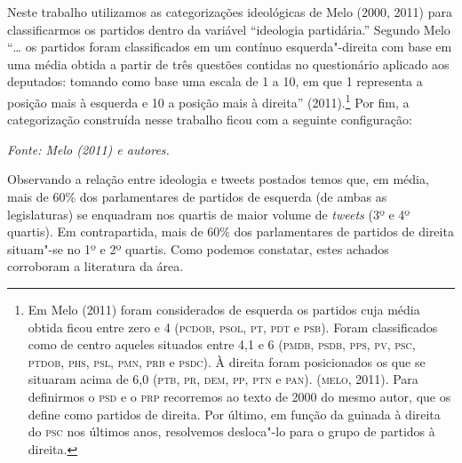 Neste trabalho utilizamos as categorizações ideológicas de Melo (2000,
2011) para classificarmos os partidos dentro da variável ``ideologia
partidária.'' Segundo Melo ``\ldots{} os partidos foram classificados em um
contínuo esquerda"-direita com base em uma média obtida a partir de três
questões contidas no questionário aplicado aos deputados: tomando como
base uma escala de 1 a 10, em que 1 representa a posição mais à esquerda
e 10 a posição mais à direita'' (2011).\footnote{Em Melo (2011) foram
  considerados de esquerda os partidos cuja média obtida ficou entre
  zero e 4 (\textsc{pcdob}, \textsc{psol}, \textsc{pt}, \textsc{pdt} e \textsc{psb}). Foram classificados como de
  centro aqueles situados entre 4,1 e 6 (\textsc{pmdb}, \textsc{psdb}, \textsc{pps}, \textsc{pv}, \textsc{psc},
  \textsc{ptdob}, \textsc{phs}, \textsc{psl}, \textsc{pmn}, \textsc{prb} e \textsc{psdc}). À direita foram posicionados os que
  se situaram acima de 6,0 (\textsc{ptb}, \textsc{pr}, \textsc{dem}, \textsc{pp}, \textsc{ptn} e \textsc{pan}). (\textsc{melo}, 2011).
  Para definirmos o \textsc{psd} e o \textsc{prp} recorremos ao texto de 2000 do mesmo
  autor, que os define como partidos de direita. Por último, em função
  da guinada à direita do \textsc{psc} nos últimos anos, resolvemos desloca"-lo
  para o grupo de partidos à direita.} Por fim, a categorização
construída nesse trabalho ficou com a seguinte configuração:

\begin{center}

{\footnotesize\emph{Fonte: Melo (2011) e autores.}}
\end{center}

Observando a relação entre ideologia e tweets postados temos que, em
média, mais de 60\% dos parlamentares de partidos de esquerda (de ambas
as legislaturas) se enquadram nos quartis de maior volume de
\emph{tweets} (3º e 4º quartis). Em contrapartida, mais de 60\% dos
parlamentares de partidos de direita situam"-se no 1º e 2º quartis. Como
podemos constatar, estes achados corroboram a literatura da área.

